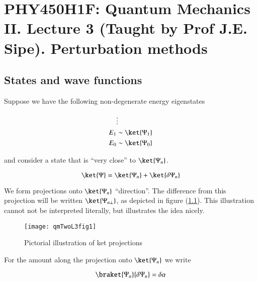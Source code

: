 %
%

\chapter{PHY450H1F: Quantum Mechanics II.  Lecture 3 (Taught by Prof J.E. Sipe).  Perturbation methods}
\label{chap:qmTwoL3}
{}
\date{Sept 19, 2011}

\beginArtWithToc

\section{States and wave functions}

Suppose we have the following non-degenerate energy eigenstates

\begin{align*}
&\vdots \\
E_1 &\sim \ket{\Psi_1} \\
E_0 &\sim \ket{\Psi_0}
\end{align*}

and consider a state that is ``very close'' to $\ket{\Psi_n}$.

\begin{equation}\label{eqn:qmTwoL3:10}
\ket{\Psi} = \ket{\Psi_n} + \ket{\delta \Psi_n}
\end{equation}

We form projections onto $\ket{\Psi_n}$ ``direction''.  The difference from this projection will be written $\ket{\Psi_{n \perp}}$, as depicted in figure (\ref{fig:qmTwoL3fig1}).  This illustration cannot not be interpreted literally, but illustrates the idea nicely.

\begin{figure}[htp]
\centering
\texttt{[image: qmTwoL3fig1]}
\caption{Pictorial illustration of ket projections}\label{fig:qmTwoL3fig1}
\end{figure}

For the amount along the projection onto $\ket{\Psi_n}$ we write

\begin{equation}\label{eqn:qmTwoL3:30}
\braket{\Psi_n}{\delta \Psi_n} = \delta \alpha
\end{equation}

